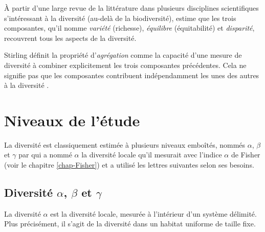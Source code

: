 \documentclass[
  11pt,
  american,
  a4paper,
  extrafontsizes,onecolumn,openright
  ]{memoir}
\begin{document}
À partir d'une large revue de la littérature dans plusieurs disciplines scientifiques s'intéressant à la diversité (au-delà de la biodiversité), \textcite{Stirling2007} estime que les trois composantes, qu'il nomme \emph{variété} (richesse), \emph{équilibre} (équitabilité) et \emph{disparité}, recouvrent tous les aspects de la diversité.

Stirling définit la propriété d'\emph{agrégation} comme la capacité d'une mesure de diversité à combiner explicitement les trois composantes précédentes.
Cela ne signifie pas que les composantes contribuent indépendamment les unes des autres à la diversité \autocite{Jost2010}.

\hypertarget{niveaux-de-luxe9tude}{%
\section{Niveaux de l'étude}\label{niveaux-de-luxe9tude}}

La diversité est classiquement estimée à plusieurs niveaux emboîtés, nommés \(\alpha\), \(\beta\) et \(\gamma\) par \textcite[page 320]{Whittaker1960} qui a nommé \(\alpha\) la diversité locale qu'il mesurait avec l'indice \(\alpha\) de Fisher (voir le chapitre \ref{chap-Fisher}) et a utilisé les lettres suivantes selon ses besoins.

\hypertarget{diversituxe9-alpha-beta-et-gamma}{%
\subsection{\texorpdfstring{Diversité \(\alpha\), \(\beta\) et \(\gamma\)}{Diversité \textbackslash alpha, \textbackslash beta et \textbackslash gamma}}\label{diversituxe9-alpha-beta-et-gamma}}

La diversité \(\alpha\) est la diversité locale, mesurée à l'intérieur d'un système délimité.
Plus précisément, il s'agit de la diversité dans un habitat uniforme de taille fixe.



\scriptsize
\end{document}
